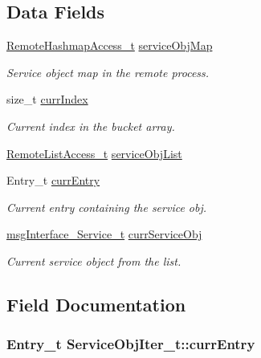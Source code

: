\subsection*{Data Fields}
\begin{DoxyCompactItemize}
\item 
\hyperlink{struct_remote_hashmap_access__t}{Remote\+Hashmap\+Access\+\_\+t} \hyperlink{struct_service_obj_iter__t_a5fd38c48b804445d7035b732c6913e82}{service\+Obj\+Map}
\begin{DoxyCompactList}\small\item\em Service object map in the remote process. \end{DoxyCompactList}\item 
size\+\_\+t \hyperlink{struct_service_obj_iter__t_a3d5eca055cbc01d574d8f8b82fd7ff33}{curr\+Index}
\begin{DoxyCompactList}\small\item\em Current index in the bucket array. \end{DoxyCompactList}\item 
\hyperlink{struct_remote_list_access__t}{Remote\+List\+Access\+\_\+t} \hyperlink{struct_service_obj_iter__t_a6565ae4e4656a3aa2e657d198cbc6ba5}{service\+Obj\+List}
\item 
Entry\+\_\+t \hyperlink{struct_service_obj_iter__t_abffbb8973fa7415d9b4a4f2a6316cecb}{curr\+Entry}
\begin{DoxyCompactList}\small\item\em Current entry containing the service obj. \end{DoxyCompactList}\item 
\hyperlink{structmsg_interface___service__t}{msg\+Interface\+\_\+\+Service\+\_\+t} \hyperlink{struct_service_obj_iter__t_a7dffa77b0a4e5a7d171811e3f70f295a}{curr\+Service\+Obj}
\begin{DoxyCompactList}\small\item\em Current service object from the list. \end{DoxyCompactList}\end{DoxyCompactItemize}


\subsection{Field Documentation}
\subsubsection[{\texorpdfstring{curr\+Entry}{currEntry}}]{\setlength{\rightskip}{0pt plus 5cm}Entry\+\_\+t Service\+Obj\+Iter\+\_\+t\+::curr\+Entry}\hypertarget{struct_service_obj_iter__t_abffbb8973fa7415d9b4a4f2a6316cecb}{}\label{struct_service_obj_iter__t_abffbb8973fa7415d9b4a4f2a6316cecb}


